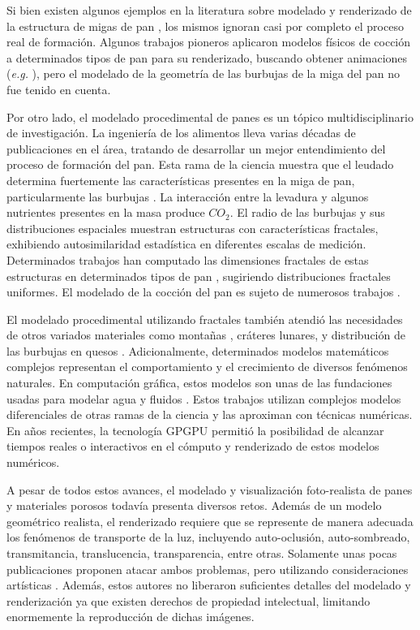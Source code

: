 Si bien existen algunos ejemplos en la literatura sobre modelado y renderizado de la estructura de migas de pan \cite{Tong2005,Xenakis2007}, los mismos ignoran casi por completo el proceso real de formación.
Algunos trabajos pioneros aplicaron modelos físicos de cocción a determinados tipos de pan para su renderizado, buscando obtener animaciones ({\em e.g.} \cite{Rodriguez-Arenas2011}), pero el modelado de la geometría de las burbujas de la miga del pan no fue tenido en cuenta.

Por otro lado, el modelado procedimental de panes es un tópico multidisciplinario de investigación.
La ingeniería de los alimentos lleva varias décadas de publicaciones en el área, tratando de desarrollar un mejor entendimiento del proceso de formación del pan.
Esta rama de la ciencia muestra que el leudado determina fuertemente las características presentes en la miga de pan, particularmente las burbujas \cite{Babin2006}.
La interacción entre la levadura y algunos nutrientes presentes en la masa produce {\em $CO_{2}$}. 
El radio de las burbujas y sus distribuciones espaciales muestran estructuras con características fractales, exhibiendo autosimilaridad estadística en diferentes escalas de medición.
Determinados trabajos han computado las dimensiones fractales de estas estructuras en determinados tipos de pan \cite{Gonzales2008}, sugiriendo distribuciones fractales uniformes.
El modelado de la cocción del pan es sujeto de numerosos trabajos \cite{Mondal2008}.

El modelado procedimental utilizando fractales también atendió las necesidades de otros variados materiales como montañas \cite{Prusinkiewicz1993}, cráteres lunares, y distribución de las burbujas en quesos \cite{Mandelbrot1983}. 
Adicionalmente, determinados modelos matemáticos complejos representan el comportamiento y el crecimiento de diversos fenómenos naturales.
En computación gráfica, estos modelos son unas de las fundaciones usadas para modelar agua y fluidos \cite{Stam1999,Fedkiw2001}.
Estos trabajos utilizan complejos modelos diferenciales de otras ramas de la ciencia y las aproximan con técnicas numéricas.
En años recientes, la tecnología GPGPU \cite{Owens2007} permitió la posibilidad de alcanzar tiempos reales o interactivos en el cómputo y renderizado de estos modelos numéricos.

A pesar de todos estos avances, el modelado y visualización foto-realista de panes y materiales porosos todavía presenta diversos retos.
Además de un modelo geométrico realista, el renderizado requiere que se represente de manera adecuada los fenómenos de transporte de la luz, incluyendo auto-oclusión, auto-sombreado, transmitancia, translucencia, transparencia, entre otras.
Solamente unas pocas publicaciones proponen atacar ambos problemas, pero utilizando consideraciones artísticas \cite{Xenakis2007}.
Además, estos autores no liberaron suficientes detalles del modelado y renderización ya que existen derechos de propiedad intelectual, limitando enormemente la reproducción de dichas imágenes.

